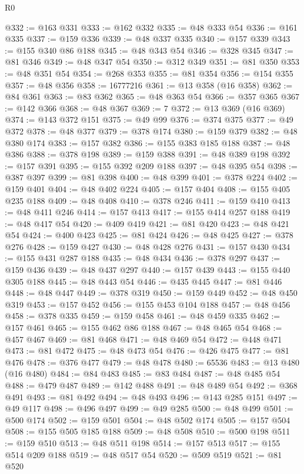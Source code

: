 \begin{lexlean}{R0}
\begin{coremodule}
@332 := @163 @331
@333 := @162 @332
@335 := @48 @333 @54
@336 := @161 @335
@337 := @159 @336
@339 := @48 @337 @335
@340 := @157 @339
@343 := @155 @340 @86 @188
@345 := @48 @343 @54
@346 := @328 @345
@347 := @81 @346
@349 := @48 @347 @54
@350 := @312 @349
@351 := @81 @350
@353 := @48 @351 @54
@354 := @268 @353
@355 := @81 @354
@356 := @154 @355
@357 := @48 @356
@358 := 16777216
@361 := @13 @358 (@16 @358)
@362 := @84 @361
@363 := @83 @362
@365 := @48 @363 @54
@366 := @357 @365
@367 := @142 @366
@368 := @48 @367
@369 := 7
@372 := @13 @369 (@16 @369)
@374 := @143 @372 @151
@375 := @49 @99
@376 := @374 @375
@377 := @49 @372
@378 := @48 @377
@379 := @378 @174
@380 := @159 @379
@382 := @48 @380 @174
@383 := @157 @382
@386 := @155 @383 @185 @188
@387 := @48 @386
@388 := @378 @198
@389 := @159 @388
@391 := @48 @389 @198
@392 := @157 @391
@395 := @155 @392 @209 @188
@397 := @48 @395 @54
@398 := @387 @397
@399 := @81 @398
@400 := @48 @399
@401 := @378 @224
@402 := @159 @401
@404 := @48 @402 @224
@405 := @157 @404
@408 := @155 @405 @235 @188
@409 := @48 @408
@410 := @378 @246
@411 := @159 @410
@413 := @48 @411 @246
@414 := @157 @413
@417 := @155 @414 @257 @188
@419 := @48 @417 @54
@420 := @409 @419
@421 := @81 @420
@423 := @48 @421 @54
@424 := @400 @423
@425 := @81 @424
@426 := @48 @425
@427 := @378 @276
@428 := @159 @427
@430 := @48 @428 @276
@431 := @157 @430
@434 := @155 @431 @287 @188
@435 := @48 @434
@436 := @378 @297
@437 := @159 @436
@439 := @48 @437 @297
@440 := @157 @439
@443 := @155 @440 @305 @188
@445 := @48 @443 @54
@446 := @435 @445
@447 := @81 @446
@448 := @48 @447
@449 := @378 @319
@450 := @159 @449
@452 := @48 @450 @319
@453 := @157 @452
@456 := @155 @453 @104 @188
@457 := @48 @456
@458 := @378 @335
@459 := @159 @458
@461 := @48 @459 @335
@462 := @157 @461
@465 := @155 @462 @86 @188
@467 := @48 @465 @54
@468 := @457 @467
@469 := @81 @468
@471 := @48 @469 @54
@472 := @448 @471
@473 := @81 @472
@475 := @48 @473 @54
@476 := @426 @475
@477 := @81 @476
@478 := @376 @477
@479 := @48 @478
@480 := 65536
@483 := @13 @480 (@16 @480)
@484 := @84 @483
@485 := @83 @484
@487 := @48 @485 @54
@488 := @479 @487
@489 := @142 @488
@491 := @48 @489 @54
@492 := @368 @491
@493 := @81 @492
@494 := @48 @493
@496 := @143 @285 @151
@497 := @49 @117
@498 := @496 @497
@499 := @49 @285
@500 := @48 @499
@501 := @500 @174
@502 := @159 @501
@504 := @48 @502 @174
@505 := @157 @504
@508 := @155 @505 @185 @188
@509 := @48 @508
@510 := @500 @198
@511 := @159 @510
@513 := @48 @511 @198
@514 := @157 @513
@517 := @155 @514 @209 @188
@519 := @48 @517 @54
@520 := @509 @519
@521 := @81 @520

\end{coremodule}
\end{lexlean}
